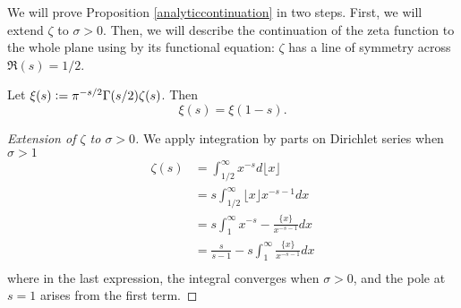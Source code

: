 We will prove Proposition \ref{analyticcontinuation} in two steps. First, we will extend $\zeta$ to $\sigma>0$. Then, we will describe the continuation of the zeta function to the whole plane using by its functional equation: $\zeta$ has a line of symmetry across $\Re (s)=1/2$.
\begin{proposition}\label{extension}
	Let $\xi(s)\mathrel{\mathop:}= \pi^{-s/2}\Gamma(s/2)\zeta(s)$. Then \begin{equation}\label{symmetryeq}
		\xi(s) = \xi(1-s).
	\end{equation}
\end{proposition}
\begin{proof}[Extension of $\zeta$ to $\sigma>0$]
	We apply integration by parts on Dirichlet series when $\sigma>1$ \begin{align*}
		\zeta(s)&=\int_{1/2}^{\infty} x^{-s} d \lfloor x \rfloor \\
				&= s \int_{1/2}^{\infty} \lfloor x \rfloor x^{-s-1} d x\\
				&=  s \int_{1}^{\infty}  x^{-s} - \frac{\{x\}}{x^{-s-1}} d x\\
				&= \frac{s}{s-1} - s \int_{1}^{\infty} \frac{\{x\}}{x^{-s-1}} dx\\
	\end{align*}
	where in the last expression, the integral converges when $\sigma>0$, and the pole at $s=1$ arises from the first term.
\end{proof}


